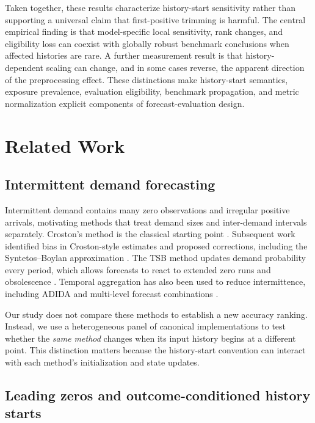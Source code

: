 Taken together, these results characterize history-start sensitivity rather than supporting a universal claim that first-positive trimming is harmful. The central empirical finding is that model-specific local sensitivity, rank changes, and eligibility loss can coexist with globally robust benchmark conclusions when affected histories are rare. A further measurement result is that history-dependent scaling can change, and in some cases reverse, the apparent direction of the preprocessing effect. These distinctions make history-start semantics, exposure prevalence, evaluation eligibility, benchmark propagation, and metric normalization explicit components of forecast-evaluation design.

\section{Related Work}

\subsection{Intermittent demand forecasting}

Intermittent demand contains many zero observations and irregular positive arrivals, motivating methods that treat demand sizes and inter-demand intervals separately. Croston's method is the classical starting point \citep{croston1972}. Subsequent work identified bias in Croston-style estimates and proposed corrections, including the Syntetos--Boylan approximation \citep{syntetos2005accuracy}. The TSB method updates demand probability every period, which allows forecasts to react to extended zero runs and obsolescence \citep{teunter2011tsb}. Temporal aggregation has also been used to reduce intermittence, including ADIDA \citep{nikolopoulos2011adida} and multi-level forecast combinations \citep{petropoulos2015combinations}.

Our study does not compare these methods to establish a new accuracy ranking. Instead, we use a heterogeneous panel of canonical implementations to test whether the \emph{same method} changes when its input history begins at a different point. This distinction matters because the history-start convention can interact with each method's initialization and state updates.

\subsection{Leading zeros and outcome-conditioned history starts}

